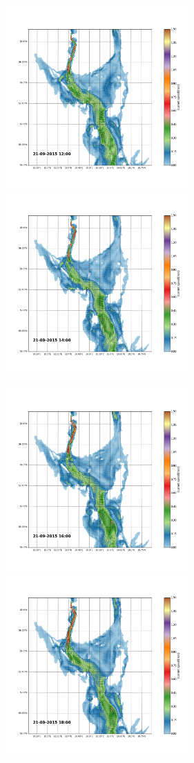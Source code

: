 \documentclass[12pt,a4paper,english]{article}
\begin{document}
\begin{figure}[ht]
\centerline{
\includegraphics*[trim=2.0cm 3cm 6.0cm 3.5cm,clip=true,height=7cm]{Python/stromfelt_70}
\includegraphics*[trim=3.7cm 3cm 1.3cm 3.5cm,clip=true,height=7cm]{Python/stromfelt_72}
}
\centerline{
\includegraphics*[trim=2.0cm 3cm 6.0cm 3.5cm,clip=true,height=7cm]{Python/stromfelt_74}
\includegraphics*[trim=3.7cm 3cm 1.3cm 3.5cm,clip=true,height=7cm]{Python/stromfelt_76}
}
\end{figure}
\end{document}
